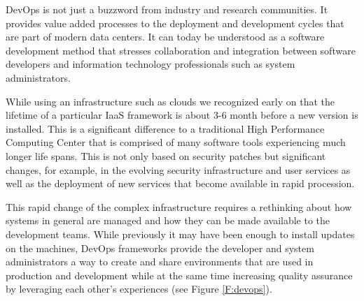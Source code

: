 \documentclass{article}
\begin{document}
DevOps is not just a buzzword from industry and research communities. It provides value added processes to the deployment and development cycles that are part of modern data centers. It can today be understood as a software development method that stresses collaboration and integration between software developers and information technology professionals such as system administrators.


While using an infrastructure such as clouds we recognized early on that the lifetime of a particular IaaS framework is about 3-6 month before a new version is installed. This is a significant difference to a traditional High Performance Computing Center that is comprised of many software tools experiencing much longer life spans. This is not only based on security patches but significant changes, for example, in the evolving security infrastructure and  user services as well as the deployment of new services that become available in rapid procession.


This rapid change of the complex infrastructure requires a rethinking about how systems in general are managed and how they can be made available to the development teams. While previously it may have been enough to install updates on the machines, DevOps frameworks provide the developer and system administrators a way to create and share environments that are used in production and development while at the same time increasing quality assurance by leveraging each other’s experiences (see Figure \ref{F:devops}).
\end{document}
